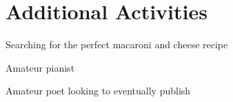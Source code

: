 \documentclass[10.5pt, letterpaper]{article}
\begin{document}
\section*{Additional Activities}

\begin{center}
	\begin{multicols}{2}
		\begin{description}
			\item Searching for the perfect macaroni and cheese recipe
			\item Amateur pianist
			\item Amateur poet looking to eventually publish
		\end{description}
	\end{multicols}
\end{center}
\end{document}
